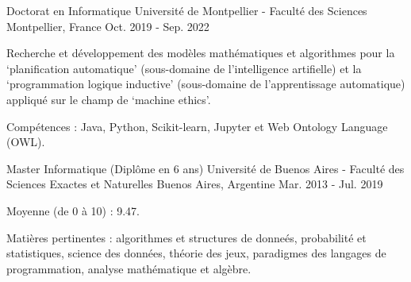 

\begin{cventries}

  \cventry
    {Doctorat en Informatique}
    {Université de Montpellier - Faculté des Sciences}
    {Montpellier, France}
    {Oct. 2019 - Sep. 2022}
    {
      \begin{cvitems}
        \item Recherche et développement des modèles mathématiques et algorithmes pour la `planification automatique' (sous-domaine de l'intelligence artifielle) et la `programmation logique inductive' (sous-domaine de l'apprentissage automatique) appliqué sur le champ de `machine ethics'.
        \item Compétences : Java, Python, Scikit-learn, Jupyter et Web Ontology Language (OWL).
      \end{cvitems}
    }  

  \cventry
  {Master Informatique (Diplôme en 6 ans)}
  {Université de Buenos Aires - Faculté des Sciences Exactes et Naturelles}
  {Buenos Aires, Argentine}
  {Mar. 2013 - Jul. 2019}
  {
    \begin{cvitems}
      \item Moyenne (de 0 à 10) : 9.47.
      \item Matières pertinentes : algorithmes et structures de donneés, probabilité et statistiques, science des données, théorie des jeux, paradigmes des langages de programmation, analyse mathématique et algèbre.
    \end{cvitems}
  }  

\end{cventries}
